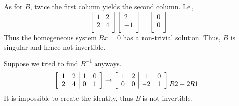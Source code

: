 \documentclass{article}
\begin{document}
\begin{example}
  As for $B$, twice the first column yields the second column. I.e.,
  \[
    \begin{bmatrix}
      1 & 2\\
      2 & 4\\
    \end{bmatrix}
    \begin{bmatrix}
      2\\
      -1\\
    \end{bmatrix}
    =
    \begin{bmatrix}
      0\\
      0\\
    \end{bmatrix}
  \]
  Thus the homogeneous system $Bx = 0$ has a non-trivial solution. Thus, $B$ is singular and hence not invertible.

  Suppose we tried to find $B^{-1}$ anyways.
  \[
    \left[
      \begin{array}{cc|cc}
        1 & 2 & 1 & 0\\
        2 & 4 & 0 & 1\\
      \end{array}
    \right]
    \to
    \left[
      \begin{array}{cc|cc}
        1 & 2 & 1 & 0\\
        0 & 0 & -2 & 1\\
      \end{array}
    \right]
    \begin{matrix}
      \\
      R2 - 2R1\\
    \end{matrix}
    \\
  \]
  It is impossible to create the identity, thus $B$ is not invertible.
\end{example}
\end{document}
